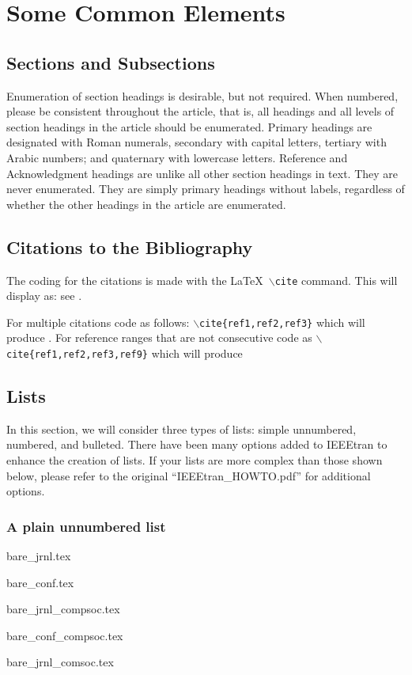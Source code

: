 \documentclass[lettersize,journal]{IEEEtran}
\begin{document}
\section{Some Common Elements}
\subsection{Sections and Subsections}
Enumeration of section headings is desirable, but not required. When numbered, please be consistent throughout the article, that is, all headings and all levels of section headings in the article should be enumerated. Primary headings are designated with Roman numerals, secondary with capital letters, tertiary with Arabic numbers; and quaternary with lowercase letters. Reference and Acknowledgment headings are unlike all other section headings in text. They are never enumerated. They are simply primary headings without labels, regardless of whether the other headings in the article are enumerated. 

\subsection{Citations to the Bibliography}
The coding for the citations is made with the \LaTeX\ $\backslash${\tt{cite}} command. 
This will display as: see \cite{ref1}.

For multiple citations code as follows: {\tt{$\backslash$cite\{ref1,ref2,ref3\}}}
 which will produce \cite{ref1,ref2,ref3}. For reference ranges that are not consecutive code as {\tt{$\backslash$cite\{ref1,ref2,ref3,ref9\}}} which will produce  \cite{ref1,ref2,ref3,ref9}

\subsection{Lists}
In this section, we will consider three types of lists: simple unnumbered, numbered, and bulleted. There have been many options added to IEEEtran to enhance the creation of lists. If your lists are more complex than those shown below, please refer to the original ``IEEEtran\_HOWTO.pdf'' for additional options.\\

\subsubsection*{\bf A plain  unnumbered list}
\begin{list}{}{}
\item{bare\_jrnl.tex}
\item{bare\_conf.tex}
\item{bare\_jrnl\_compsoc.tex}
\item{bare\_conf\_compsoc.tex}
\item{bare\_jrnl\_comsoc.tex}
\end{list}
\end{document}
